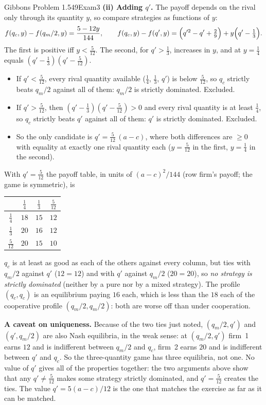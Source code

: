 \begin{exsol}{Gibbons Problem 1.5}{49}{Exam}{3}
\textbf{(ii) Adding $q'$.} The payoff depends on the rival only through its quantity $y$, so compare
strategies as functions of $y$:
\[
  f(q_c, y) - f(q_m/2, y) = \frac{5 - 12 y}{144}, \qquad
  f(q_c, y) - f(q', y) = \Bigl(q'^2 - q' + \tfrac29\Bigr) + y\Bigl(q' - \tfrac13\Bigr).
\]
The first is positive iff $y < \tfrac5{12}$. The second, for $q' > \tfrac13$, increases in $y$, and at $y = \tfrac14$
equals $(q' - \tfrac13)(q' - \tfrac5{12})$.
\begin{itemize}
  \item If $q' < \tfrac5{12}$, every rival quantity available ($\tfrac14$, $\tfrac13$, $q'$) is below $\tfrac5{12}$,
  so $q_c$ strictly beats $q_m/2$ against all of them: $q_m/2$ is strictly dominated. Excluded.
  \item If $q' > \tfrac5{12}$, then $(q'-\tfrac13)(q'-\tfrac5{12}) > 0$ and every rival quantity is at
  least $\tfrac14$, so $q_c$ strictly beats $q'$ against all of them: $q'$ is strictly dominated. Excluded.
  \item So the only candidate is $q' = \tfrac5{12}\,(a - c)$, where both differences are $\ge 0$ with equality at exactly one
  rival quantity each ($y = \tfrac5{12}$ in the first, $y = \tfrac14$ in the second).
\end{itemize}
With $q' = \tfrac5{12}$ the payoff table, in units of $(a-c)^2/144$ (row firm's payoff; the game is symmetric), is
\begin{center}
\begin{tabular}{c|ccc}
 & $\tfrac14$ & $\tfrac13$ & $\tfrac5{12}$ \\ \hline
$\tfrac14$ & $18$ & $15$ & $12$ \\
$\tfrac13$ & $20$ & $16$ & $12$ \\
$\tfrac5{12}$ & $20$ & $15$ & $10$ \\
\end{tabular}
\end{center}
$q_c$ is at least as good as each of the others against every column, but ties with $q_m/2$ against
$q'$ ($12 = 12$) and with $q'$ against $q_m/2$ ($20 = 20$), so \emph{no strategy is strictly dominated}
(neither by a pure nor by a mixed strategy). The profile $(q_c, q_c)$ is an equilibrium paying $16$ each, which is
less than the $18$ each of the cooperative profile $(q_m/2, q_m/2)$: both are worse off than under cooperation.

\textbf{A caveat on uniqueness.} Because of the two ties just noted, $(q_m/2, q')$ and $(q', q_m/2)$ are also Nash
equilibria, in the weak sense: at $(q_m/2, q')$ firm~1 earns $12$ and is indifferent between $q_m/2$ and
$q_c$, firm~2 earns $20$ and is indifferent between $q'$ and $q_c$. So the three-quantity game has
three equilibria, not one. No value of $q'$ gives all of the properties together: the two arguments
above show that any $q' \ne \tfrac5{12}$ makes some strategy strictly dominated, and $q' = \tfrac5{12}$
creates the ties. The value $q' = 5(a-c)/12$ is the one that matches the exercise as far as it can be matched.


\end{exsol}

